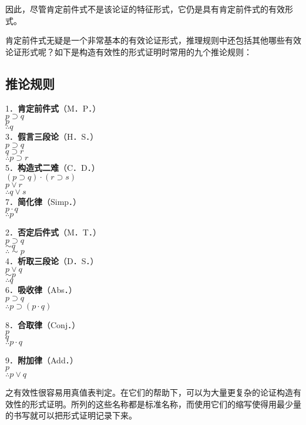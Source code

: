 因此，尽管肯定前件式不是该论证的特征形式，它仍是具有肯定前件式的有效形式。

肯定前件式无疑是一个非常基本的有效论证形式，推理规则中还包括其他哪些有效论证形式呢？如下是构造有效性的形式证明时常用的九个推论规则：

\subsection{推论规则}
1．\textbf{肯定前件式}（M．P．）\\
$p \supset q$\\
$p$\\
$\therefore q$\\
3．\textbf{假言三段论}（H．S．）\\
$p \supset q$\\
$q \supset r$\\
$\therefore p \supset r$\\
5．\textbf{构造式二难}（C．D．）\\
$(p \supset q) \cdot(r \supset s)$\\
$p \vee r$\\
$\therefore q \vee s$\\
7．\textbf{简化律}（Simp．）\\
$p \cdot q$\\
$\therefore p$

2．\textbf{否定后件式}（M．T．）\\
$p \supset q$\\
$\sim q$\\
$\therefore \sim p$\\
4．\textbf{析取三段论}（D．S．）\\
$p \vee q$\\
$\sim p$\\
$\therefore q$\\
6．\textbf{吸收律}（Abs．）\\
$p \supset q$\\
$\therefore p \supset(p \cdot q)$

8．\textbf{合取律}（Conj．）\\
$p$\\
$q$\\
$\therefore p \cdot q$

9．\textbf{附加律}（Add．）\\
$p$\\
$\therefore p \vee q$

之有效性很容易用真值表判定。在它们的帮助下，可以为大量更复杂的论证构造有效性的形式证明。所列的这些名称都是标准名称，而使用它们的缩写使得用最少量的书写就可以把形式证明记录下来。

